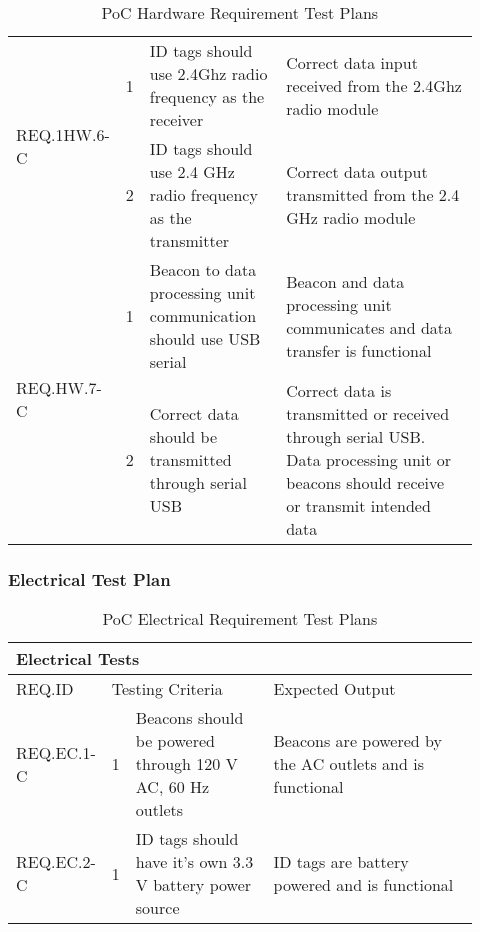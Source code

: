 \begin{table}[h!]
\begin{tabular}{|m{0.15\linewidth}|m{0.02\linewidth}|m{0.3\linewidth}|m{0.45\linewidth}|}
    \multirow{2}{*}{REQ.1HW.6-C} 
    & 1 
    & ID tags should use 2.4Ghz radio frequency as the receiver     
    & Correct data input received from the 2.4Ghz radio module          \\ 
    \cline{2-4}
    & 2 
    & ID tags should use 2.4 GHz radio frequency as the transmitter     
    & Correct data output transmitted from the 2.4 GHz radio module   \\
    \hline
    
    \multirow{2}{*}{REQ.HW.7-C} 
    & 1 
    & Beacon to data processing unit communication should use USB serial
    & Beacon and data processing unit communicates and data transfer is functional         \\ 
    \cline{2-4}
    & 2 
    & Correct data should be transmitted through serial USB     
    & Correct data is transmitted or received through serial USB. Data processing unit or beacons should receive or transmit
    intended data   \\
    \hline    

\end{tabular}
    \caption{PoC Hardware Requirement Test Plans}
\end{table}



\break
\subsubsection{Electrical Test Plan}

\begin{table}[h!]
    \centering
    
    \begin{tabular}{|m{0.15\linewidth}|m{0.02\linewidth}|m{0.3\linewidth}|m{0.45\linewidth}|} 
    \hline
    \multicolumn{4}{|l|}{Electrical Tests}      \\ 
    \hline
    REQ.ID   & \multicolumn{2}{l|}{Testing Criteria}     & Expected Output     \\ 
    \hline
    REQ.EC.1-C                  
    & 1 
    & Beacons should be powered through 120 V AC, 60 Hz outlets
    & Beacons are powered by the AC outlets and is functional   \\ 
    \hline
    REQ.EC.2-C                  
    & 1 
    & ID tags should have it's own 3.3 V battery power source
    & ID tags are battery powered and is functional  \\ 
    \hline
\end{tabular}
	\caption{PoC Electrical Requirement Test Plans}
\end{table}

